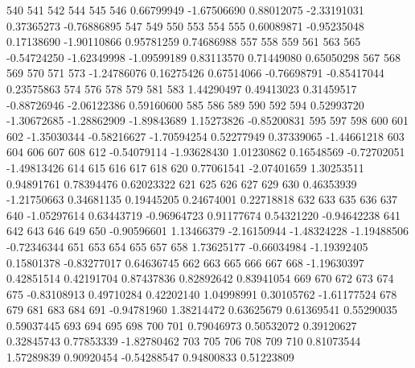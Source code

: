 \documentclass{article}
\begin{document}
\begin{Schunk}
\begin{Soutput}
        540         541         542         544         545         546 
 0.66799949 -1.67506690  0.88012075 -2.33191031  0.37365273 -0.76886895 
        547         549         550         553         554         555 
 0.60089871 -0.95235048  0.17138690 -1.90110866  0.95781259  0.74686988 
        557         558         559         561         563         565 
-0.54724250 -1.62349998 -1.09599189  0.83113570  0.71449080  0.65050298 
        567         568         569         570         571         573 
-1.24786076  0.16275426  0.67514066 -0.76698791 -0.85417044  0.23575863 
        574         576         578         579         581         583 
 1.44290497  0.49413023  0.31459517 -0.88726946 -2.06122386  0.59160600 
        585         586         589         590         592         594 
 0.52993720 -1.30672685 -1.28862909 -1.89843689  1.15273826 -0.85200831 
        595         597         598         600         601         602 
-1.35030344 -0.58216627 -1.70594254  0.52277949  0.37339065 -1.44661218 
        603         604         606         607         608         612 
-0.54079114 -1.93628430  1.01230862  0.16548569 -0.72702051 -1.49813426 
        614         615         616         617         618         620 
 0.77061541 -2.07401659  1.30253511  0.94891761  0.78394476  0.62023322 
        621         625         626         627         629         630 
 0.46353939 -1.21750663  0.34681135  0.19445205  0.24674001  0.22718818 
        632         633         635         636         637         640 
-1.05297614  0.63443719 -0.96964723  0.91177674  0.54321220 -0.94642238 
        641         642         643         646         649         650 
-0.90596601  1.13466379 -2.16150944 -1.48324228 -1.19488506 -0.72346344 
        651         653         654         655         657         658 
 1.73625177 -0.66034984 -1.19392405  0.15801378 -0.83277017  0.64636745 
        662         663         665         666         667         668 
-1.19630397  0.42851514  0.42191704  0.87437836  0.82892642  0.83941054 
        669         670         672         673         674         675 
-0.83108913  0.49710284  0.42202140  1.04998991  0.30105762 -1.61177524 
        678         679         681         683         684         691 
-0.94781960  1.38214472  0.63625679  0.61369541  0.55290035  0.59037445 
        693         694         695         698         700         701 
 0.79046973  0.50532072  0.39120627  0.32845743  0.77853339 -1.82780462 
        703         705         706         708         709         710 
 0.81073544  1.57289839  0.90920454 -0.54288547  0.94800833  0.51223809 

\end{Soutput}
\end{Schunk}
\end{document}

